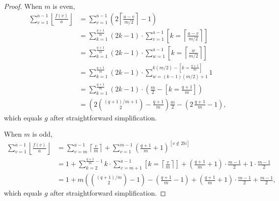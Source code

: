 \documentclass[10pt,a4paper]{amsart}
\begin{document}
\begin{proof}
    When $m$ is even,
    \begin{align*}
        \sum_{v=1}^{a-1}\left\lfloor\frac{f(v)}{a}\right\rfloor
        &= \sum_{v=1}^{a-1}\left(2\left\lceil\frac{a-v}{m/2}\right\rceil-1\right) \\
        &= \sum_{k=1}^{\frac{q+1}{m}}\left(2k-1\right)
           \cdot\sum_{v=1}^{a-1}
           \left[k=\left\lceil\tfrac{a-v}{m/2}\right\rceil\right] \\
        &= \sum_{k=1}^{\frac{q+1}{m}}\left(2k-1\right)
           \cdot\sum_{w=1}^{a-1}
           \left[k=\left\lceil\tfrac{w}{m/2}\right\rceil\right] \\
        &= \sum_{k=1}^{\frac{q+1}{m}}\left(2k-1\right)
           \cdot\sum_{w=(k-1)(m/2)+1}^{k(m/2)-[k=\frac{q+1}{m}]}1 \\
        &= \sum_{k=1}^{\frac{q+1}{m}}\left(2k-1\right)
           \cdot\left(\frac{m}{2}-\left[k=\tfrac{q+1}{m}\right]\right) \\
        &= \left(2\binom{(q+1)/m+1}{2}-\frac{q+1}{m}\right)\frac{m}{2}
           - \left(2\,\frac{q+1}{m}-1\right),
    \end{align*}
    which equals $g$ after straightforward simplification.

    When $m$ is odd,
    \begin{align*}
        \sum_{v=1}^{a-1}\left\lfloor\frac{f(v)}{a}\right\rfloor
        &= \sum_{v=m}^{a-1}\left\lceil\frac{v}{m}\right\rceil
           + \sum_{v=1}^{m-1}
             \left(\frac{q+1}{m}+1\right)^{[v\notin 2\mathbb{N}]} \\
        &= 1 + \sum_{k=2}^{\frac{q+1}{m}-1} k
             \cdot\sum_{v=m+1}^{a-1}
             \left[k=\left\lceil\tfrac{v}{m}\right\rceil\right]
           + \left(\frac{q+1}{m}+1\right)\cdot\frac{m-1}{2}
           + 1\cdot\frac{m-1}{2} \\
        &= 1 + m\!\left(\binom{(q+1)/m}{2}-1\right)
           - \left(\frac{q+1}{m}-1\right)
           + \left(\frac{q+1}{m}+1\right)\cdot\frac{m-1}{2}
           + \frac{m-1}{2},
    \end{align*}
    which equals $g$ after straightforward simplification.
\end{proof}
\end{document}
